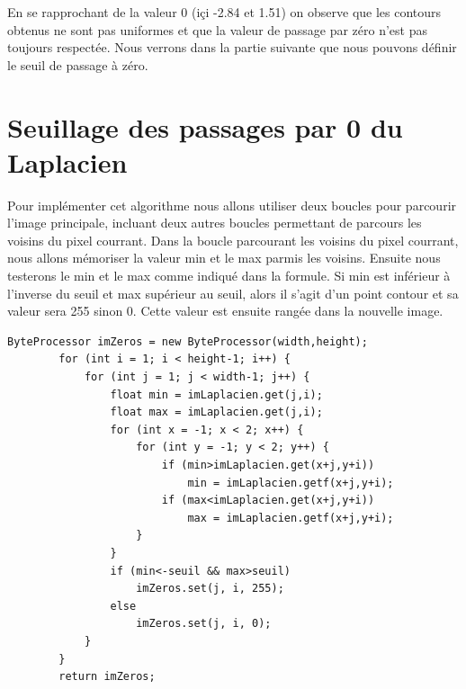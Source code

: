 \documentclass[a4paper,12pt]{report}
\begin{document}
En se rapprochant de la valeur 0 (içi -2.84 et 1.51) on observe que les contours obtenus ne sont pas uniformes et que la valeur de passage par zéro n'est pas toujours respectée.
Nous verrons dans la partie suivante que nous pouvons définir le seuil de passage à zéro.

\section*{Seuillage des passages par 0 du Laplacien}

Pour implémenter cet algorithme nous allons utiliser deux boucles pour parcourir l'image principale, incluant deux autres boucles permettant de parcours les voisins du pixel courrant.
Dans la boucle parcourant les voisins du pixel courrant, nous allons mémoriser la valeur min et le max parmis les voisins. Ensuite nous testerons le min et le max comme indiqué dans la formule.
Si min est inférieur à l'inverse du seuil et max supérieur au seuil, alors il s'agit d'un point contour et sa valeur sera 255 sinon 0.
Cette valeur est ensuite rangée dans la nouvelle image.

\begin{lstlisting}[style=Java]
ByteProcessor imZeros = new ByteProcessor(width,height);
		for (int i = 1; i < height-1; i++) {
			for (int j = 1; j < width-1; j++) {
				float min = imLaplacien.get(j,i);
				float max = imLaplacien.get(j,i);
				for (int x = -1; x < 2; x++) {
					for (int y = -1; y < 2; y++) {
						if (min>imLaplacien.get(x+j,y+i)) 
							min = imLaplacien.getf(x+j,y+i);						
						if (max<imLaplacien.get(x+j,y+i)) 
							max = imLaplacien.getf(x+j,y+i);
					}
				}
				if (min<-seuil && max>seuil) 
					imZeros.set(j, i, 255);
				else 
					imZeros.set(j, i, 0);	
			}
		}			
		return imZeros;
\end{lstlisting}

\newpage
\end{document}
